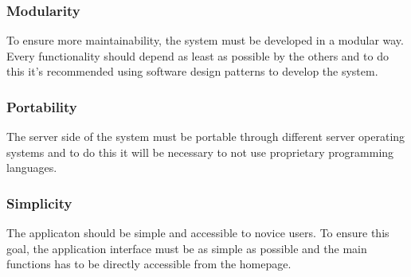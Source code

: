 	\subsubsection{Modularity}
	To ensure more maintainability, the system must be developed in a modular way. Every functionality should depend as least as possible by the others and to do this it's recommended using software design patterns to develop the system.

	\subsubsection{Portability}
	The server side of the system must be portable through different server operating systems and to do this it will be necessary to not use proprietary programming languages.

	\subsubsection{Simplicity}
	The applicaton should be simple and accessible to novice users. To ensure this goal, the application interface must be as simple as possible and the main functions has to be directly accessible from the homepage.